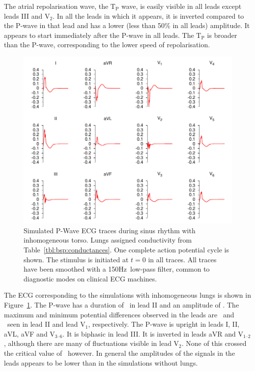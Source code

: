 The atrial repolarisation wave, the $\text{T}_{\text{P}}$ wave, is easily
visible in all leads except leads III and $\text{V}_{\text{2}}$.
In all the leads in which it appears, it is inverted compared to the P-wave in
that lead and has a lower (less than 50\% in all leads) amplitude.
It appears to start immediately after the P-wave in all leads.
The $\text{T}_{\text{P}}$ is broader than the P-wave, corresponding to the lower
speed of repolarisation.

\begin{figure}
\includegraphics{figures/bsp/ecg_lungs_150Hz}
\caption[12 lead ECG during sinus rhythm, lungs present.]{
\label{bsp:fig:ecg_lungs}
Simulated P-Wave ECG traces during sinus rhythm with inhomogeneous torso.
Lungs assigned conductivity from Table~\ref{tbl:bsp:conductances}.
One complete action potential cycle is shown.
The stimulus is initiated at $t = 0$ in all traces.
All traces have been smoothed with a \unit{150}{Hz}\ low-pass filter, common to
diagnostic modes on clinical ECG machines.
}
\end{figure}

The ECG corresponding to the simulations with inhomogeneous lungs is shown in
Figure~\ref{bsp:fig:ecg_lungs}.
The P-wave has a duration of \ in lead II and an amplitude of .
The maximum and minimum potential differences observed in the leads are
\ and \ seen in lead II and lead $\text{V}_{\text{1}}$, respectively.
The P-wave is upright in leads I, II, aVL, aVF and $\text{V}_{\text{3--6}}$.
It is biphasic in lead III.
It is inverted in leads aVR and $\text{V}_{\text{1--2}}$, although there are
many of fluctuations visible in lead $\text{V}_{\text{2}}$.
None of this crossed the critical value of \ however.
In general the amplitudes of the signals in the leads appears to be lower than
in the simulations without lungs.

